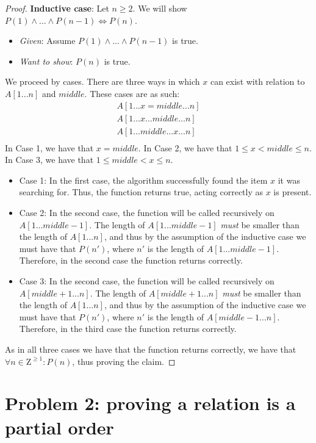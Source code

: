 \documentclass[titlepage]{article}
\begin{document}
\begin{proof}
\textbf{Inductive case}: Let $n \geq 2$.  We will show $P(1) \land ... \land P(n-1) \iff P(n)$.
\begin{itemize}
\item \emph{Given}: Assume $P(1) \land ... \land P(n-1)$ is true.
\item \emph{Want to show}: $P(n)$ is true.
\end{itemize}
We proceed by cases. There are three ways in which $x$ can exist with relation to $A[1...n]$ and $middle$. These cases are as such: 
\begin{align*}
A[1...x=middle...n] \\
A[1...x...middle...n] \\
A[1...middle...x...n] \\
\end{align*}
In Case 1, we have that $x = middle$. In Case 2, we have that $1 \leq x < middle \leq n$. In Case 3, we have that $1 \leq middle < x \leq n$.
\begin{itemize}
\item {Case 1}: In the first case, the algorithm successfully found the item $x$ it was searching for. Thus, the function returns true, acting correctly as $x$ is present.
\item {Case 2}: In the second case, the function will be called recursively on $A[1...middle-1]$. The length of $A[1...middle-1]$ \emph{must} be smaller than the length of $A[1...n]$, and thus by the assumption of the inductive case we must have that $P(n')$, where $n'$ is the length of $A[1...middle-1]$. Therefore, in the second case the function returns correctly. 
\item {Case 3}: In the second case, the function will be called recursively on $A[middle+1...n]$. The length of $A[middle+1...n]$ \emph{must} be smaller than the length of $A[1...n]$, and thus by the assumption of the inductive case we must have that $P(n')$, where $n'$ is the length of $A[middle-1...n]$. Therefore, in the third case the function returns correctly.
\end{itemize}
As in all three cases we have that the function returns correctly, we have that $\forall n \in \mathrm{Z}^{\geq 1}: P(n)$, thus proving the claim.

\end{proof}

\section{Problem 2: proving a relation is a partial order}
\end{document}
